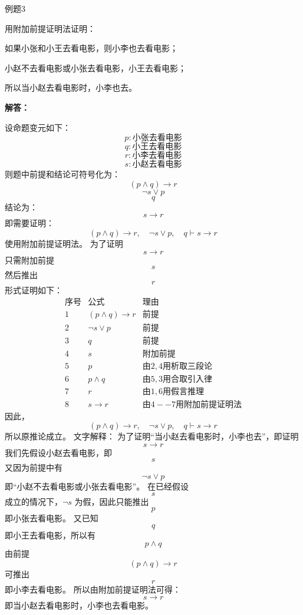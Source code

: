 \begin{question}{例题3}

用附加前提证明法证明：

如果小张和小王去看电影，则小李也去看电影；

小赵不去看电影或小张去看电影，小王去看电影；

所以当小赵去看电影时，小李也去。

\textbf{解答：}

设命题变元如下：
\[
p:\text{小张去看电影}
\]
\[
q:\text{小王去看电影}
\]
\[
r:\text{小李去看电影}
\]
\[
s:\text{小赵去看电影}
\]
则题中前提和结论可符号化为：
\[
(p\land q)\to r
\]
\[
\neg s\vee p
\]
\[
q
\]
结论为：
\[
s\to r
\]
即需要证明：
\[
(p\land q)\to r,\quad \neg s\vee p,\quad q \vdash s\to r
\]
使用附加前提证明法。
为了证明
\[
s\to r
\]
只需附加前提
\[
s
\]
然后推出
\[
r
\]
形式证明如下：
\[
\begin{array}{c|l|l}
	序号 & 公式 & 理由 \\
	\hline
	1 & (p\land q)\to r & 前提 \\
	2 & \neg s\vee p & 前提 \\
	3 & q & 前提 \\
	4 & s & 附加前提 \\
	5 & p & 由 2,4 用析取三段论 \\
	6 & p\land q & 由 5,3 用合取引入律 \\
	7 & r & 由 1,6 用假言推理 \\
	8 & s\to r & 由 4--7 用附加前提证明法
\end{array}
\]
因此，
\[
(p\land q)\to r,\quad \neg s\vee p,\quad q \vdash s\to r
\]
所以原推论成立。
文字解释：
为了证明“当小赵去看电影时，小李也去”，即证明
\[
s\to r
\]
我们先假设小赵去看电影，即
\[
s
\]
又因为前提中有
\[
\neg s\vee p
\]
即“小赵不去看电影或小张去看电影”。
在已经假设
\[
s
\]
成立的情况下，\(\neg s\) 为假，因此只能推出
\[
p
\]
即小张去看电影。
又已知
\[
q
\]
即小王去看电影，所以有
\[
p\land q
\]
由前提
\[
(p\land q)\to r
\]
可推出
\[
r
\]
即小李去看电影。
所以由附加前提证明法可得：
\[
s\to r
\]
即当小赵去看电影时，小李也去看电影。


\end{question}
